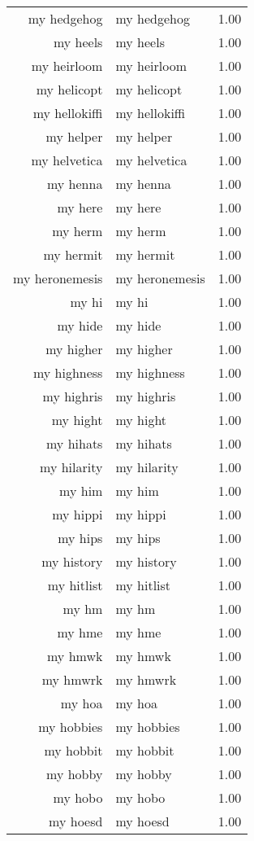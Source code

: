 \begin{table}[ht]
\begin{tabular}{rlr}
  my hedgehog & my hedgehog & 1.00 \\ 
  my heels & my heels & 1.00 \\ 
  my heirloom & my heirloom & 1.00 \\ 
  my helicopt & my helicopt & 1.00 \\ 
  my hellokiffi & my hellokiffi & 1.00 \\ 
  my helper & my helper & 1.00 \\ 
  my helvetica & my helvetica & 1.00 \\ 
  my henna & my henna & 1.00 \\ 
  my here & my here & 1.00 \\ 
  my herm & my herm & 1.00 \\ 
  my hermit & my hermit & 1.00 \\ 
  my heronemesis & my heronemesis & 1.00 \\ 
  my hi & my hi & 1.00 \\ 
  my hide & my hide & 1.00 \\ 
  my higher & my higher & 1.00 \\ 
  my highness & my highness & 1.00 \\ 
  my highris & my highris & 1.00 \\ 
  my hight & my hight & 1.00 \\ 
  my hihats & my hihats & 1.00 \\ 
  my hilarity & my hilarity & 1.00 \\ 
  my him & my him & 1.00 \\ 
  my hippi & my hippi & 1.00 \\ 
  my hips & my hips & 1.00 \\ 
  my history & my history & 1.00 \\ 
  my hitlist & my hitlist & 1.00 \\ 
  my hm & my hm & 1.00 \\ 
  my hme & my hme & 1.00 \\ 
  my hmwk & my hmwk & 1.00 \\ 
  my hmwrk & my hmwrk & 1.00 \\ 
  my hoa & my hoa & 1.00 \\ 
  my hobbies & my hobbies & 1.00 \\ 
  my hobbit & my hobbit & 1.00 \\ 
  my hobby & my hobby & 1.00 \\ 
  my hobo & my hobo & 1.00 \\ 
  my hoesd & my hoesd & 1.00 \\ 

\end{tabular}
\end{table}

